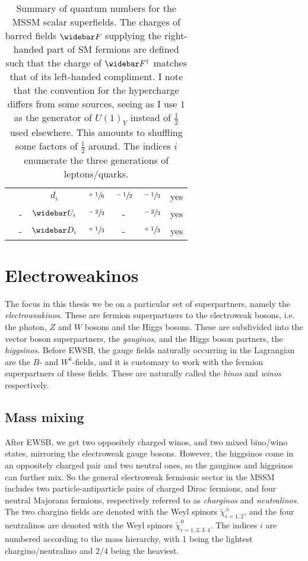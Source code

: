 \documentclass[../main.tex]{subfiles}
\begin{document}
{\begin{table}[ht!]
\begin{tabular}{|l|c|c|c|c|c|c|}
                                             &                                  & \(d_i\)           & \(\sfrac{+1}{6}\) & \(\sfrac{-1}{2}\)       & \(\sfrac{-1}{3}\) & yes \\
    \cline{2-7}
                                             & -                                & \(\wbar{U}_i\)    & \(\sfrac{-2}{3}\) & -                       & \(\sfrac{-2}{3}\) & yes \\
                                             & -                                & \(\wbar{D}_i\)    & \(\sfrac{+1}{3}\) & -                       & \(\sfrac{+1}{3}\) & yes \\
    \hline
  \end{tabular}
  \caption{Summary of quantum numbers for the MSSM scalar superfields.
    The charges of barred fields \(\wbar{F}\) supplying the right-handed part of SM fermions are defined such that the charge of \(\wbar{F}^\dagger\) matches that of its left-handed compliment.
    I note that the convention for the hypercharge differs from some sources, seeing as I use \(1\) as the generator of \(U(1)_Y\) instead of \(\frac{1}{2}\) used elsewhere.
    This amounts to shuffling some factors of \(\frac{1}{2}\) around.
    The indices \(i\) enumerate the three generations of leptons/quarks.}
  \label{susy:tab:mssm_quantum_numbers}
\end{table}
}




\section{Electroweakinos}
The focus in this thesis we be on a particular set of superpartners, namely the \emph{electroweakinos}.
These are fermion superpartners to the electroweak bosons, i.e. the photon, \(Z\) and \(W\) bosons and the Higgs bosons.
These are subdivided into the vector boson superpartners, the \emph{gauginos}, and the Higgs boson partners, the \emph{higgsinos}.
Before EWSB, the gauge fields naturally occurring in the Lagrangian are the \(B\)- and \(W^k\)-fields, and it is customary to work with the fermion superpartners of these fields.
These are naturally called the \emph{binos} and \emph{winos} respectively.

\subsection{Mass mixing}
After EWSB, we get two oppositely charged winos, and two mixed bino/wino states, mirroring the electroweak gauge bosons.
However, the higgsinos come in an oppositely charged pair and two neutral ones, so the gauginos and higgsinos can further mix.
So the general electroweak fermionic sector in the MSSM includes two particle-antiparticle pairs of charged Dirac fermions, and four neutral Majorana fermions, respectively referred to as \emph{charginos} and \emph{neutralinos}.
The two chargino fields are denoted with the Weyl spinors \(\tilde\chi_{i=1,2}^\pm\), and the four neutralinos are denoted with the Weyl spinors \(\tilde\chi_{i=1,2,3,4}^0\).
The indices \(i\) are numbered according to the mass hierarchy, with 1 being the lightest chargino/neutralino and 2/4 being the heaviest.
\end{document}
